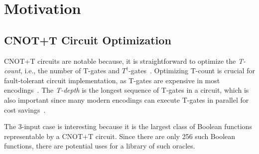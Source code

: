 \section{Motivation}

\subsection{CNOT+T Circuit Optimization}
CNOT+T circuits are notable because, it is straightforward to optimize the {\it T-count}, i.e., the number of T-gates and $T^{\dagger}$-gates~\cite{amy-meet-in-middle}. Optimizing T-count is crucial for fault-tolerant circuit implementation, as T-gates are expensive in most encodings~\cite{bib-herr-lattice,bib-fowler-bridge}. The {\it T-depth} is the longest sequence of T-gates in a circuit, which is also important since many modern encodings can execute T-gates in parallel for cost savings~\cite{bib-google-ecc}.

The 3-input case is interesting because it is the largest class of Boolean functions representable by a CNOT+T circuit. Since there are only 256 such Boolean functions, there are potential uses for a library of such oracles.
